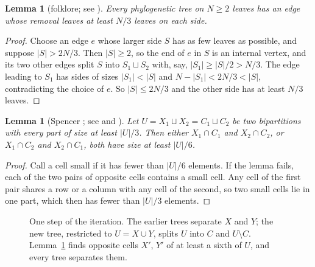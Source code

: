 \documentclass[11pt]{amsart}
\newtheorem{lemma}[theorem]{Lemma}
\theoremstyle{definition}
\begin{document}
\begin{lemma}[folklore; see {\cite[Lemma~3.1]{SY12}}]\label{lem:third}
Every phylogenetic tree on $N\ge2$ leaves has an edge whose removal leaves at least $N/3$ leaves on each side.
\end{lemma}

\begin{proof}
Choose an edge $e$ whose larger side $S$ has as few leaves as possible, and suppose $|S|>2N/3$. Then $|S|\ge2$, so
the end of $e$ in $S$ is an internal vertex, and its two other edges split $S$ into $S_1\sqcup S_2$ with, say,
$|S_1|\ge|S|/2>N/3$. The edge leading to $S_1$ has sides of sizes $|S_1|<|S|$ and $N-|S_1|<2N/3<|S|$, contradicting
the choice of $e$. So $|S|\le2N/3$ and the other side has at least $N/3$ leaves.
\end{proof}

\begin{lemma}[Spencer {\cite{Spencer}}; see {\cite[Lemma~6]{ADHSTW}} and {\cite[Theorem~3]{CCFSSW}}]\label{lem:cell}
Let $U=X_1\sqcup X_2=C_1\sqcup C_2$ be two bipartitions with every part of size at least $|U|/3$. Then either
$X_1\cap C_1$ and $X_2\cap C_2$, or $X_1\cap C_2$ and $X_2\cap C_1$, both have size at least $|U|/6$.
\end{lemma}

\begin{proof}
Call a cell small if it has fewer than $|U|/6$ elements. If the lemma fails, each of the two pairs of opposite cells
contains a small cell. Any cell of the first pair shares a row or a column with any cell of the second, so two small
cells lie in one part, which then has fewer than $|U|/3$ elements.
\end{proof}

\begin{figure}[ht]
\centering
{}
\caption{One step of the iteration. The earlier trees separate $X$ and $Y$; the new tree, restricted to
$U=X\cup Y$, splits $U$ into $C$ and $U\setminus C$. Lemma~\ref{lem:cell} finds opposite cells $X'$, $Y'$ of
at least a sixth of $U$, and every tree separates them.}
\label{fig:cell}
\end{figure}
\end{document}
